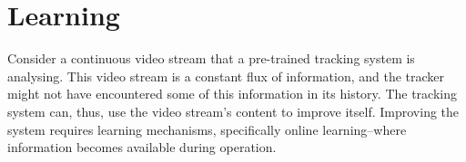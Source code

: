 \section{Learning}
  Consider a continuous video stream that a pre-trained tracking system is analysing.
  This video stream is a constant flux of information, and the tracker might not have encountered some of this information in its history.
  The tracking system can, thus, use the video stream's content to improve itself.
  Improving the system requires learning mechanisms, specifically online learning--where information becomes available during operation.
  
  
  
  

